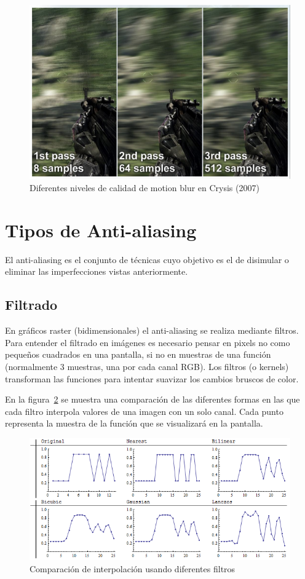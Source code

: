 \documentclass[withindex, glossary]{cam-thesis}
\begin{document}
\begin{figure}[!htbp]
    \includegraphics[width=.8\linewidth]{figures/blurringquality.png}
    \caption{Diferentes niveles de calidad de motion blur en Crysis (2007)\cite{crysis}}
    \label{blurringquality}
\end{figure}


\section{Tipos de Anti-aliasing}

El anti-aliasing es el conjunto de técnicas cuyo objetivo es el de disimular o eliminar las imperfecciones vistas anteriormente.

\subsection{Filtrado}
\label{filtros}

En gráficos raster (bidimensionales) el anti-aliasing se realiza mediante filtros. Para entender el filtrado en imágenes es necesario pensar en pixels no como pequeños cuadrados en una pantalla, si no en muestras de una función (normalmente 3 muestras, una por cada canal RGB)\cite{Smith95apixel}. Los filtros (o kernels) transforman las funciones para intentar suavizar los cambios bruscos de color.

En la figura~\ref{gls} se muestra una comparación de las diferentes formas en las que cada filtro interpola valores de una imagen con un solo canal. Cada punto representa la muestra de la función que se visualizará en la pantalla.


\begin{figure}[!htbp]
    \includegraphics[width=\linewidth]{figures/Lw6ei.png}
    \caption{Comparación de interpolación usando diferentes filtros\cite{gis}}
    \label{gls}
\end{figure}
\end{document}
